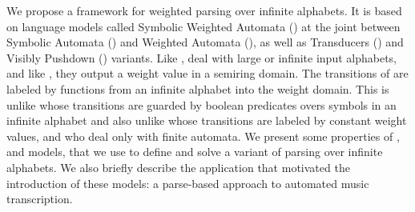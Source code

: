 %
%
We propose a framework for weighted parsing over infinite alphabets.
%
It is based on language models called Symbolic Weighted Automata (\SWA) 
at the joint %
between Symbolic Automata (\SA) and Weighted Automata (\WA), 
as well as Transducers (\SWT) and Visibly Pushdown (\SWVPA) variants.
%
Like \SA, \SWA deal with large or infinite input alphabets, 
and like \WA, they output a weight value in a semiring domain.
The transitions of \SWA are labeled by functions from an infinite alphabet into the weight domain. 
This is unlike \SA whose transitions are guarded by boolean predicates 
overs symbols in an infinite alphabet 
and also unlike \WA whose transitions are labeled by constant weight values, 
and who deal only with finite automata.
%
We present some properties of \SWA, \SWT and \SWVPA models, 
that we use to define and solve a variant of parsing 
over infinite alphabets.
%
We also briefly describe the application that motivated the introduction of these models: 
a parse-based approach to automated music transcription.